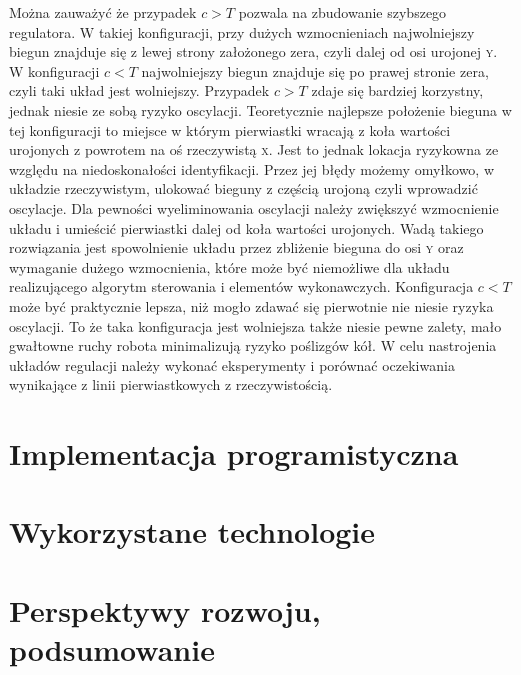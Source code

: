 \documentclass[11pt]{article}
\begin{document}
Można zauważyć że przypadek $ c > T $ pozwala na zbudowanie szybszego regulatora.
W takiej konfiguracji, przy dużych wzmocnieniach najwolniejszy biegun znajduje się z lewej strony założonego zera, czyli dalej od osi urojonej \textsc{y}.
W konfiguracji $ c < T $ najwolniejszy biegun znajduje się po prawej stronie zera, czyli taki układ jest wolniejszy.
Przypadek $ c > T $ zdaje się bardziej korzystny, jednak niesie ze sobą ryzyko oscylacji.
Teoretycznie najlepsze położenie bieguna w tej konfiguracji to miejsce w którym pierwiastki wracają z koła wartości urojonych z powrotem na oś rzeczywistą \textsc{x}.
Jest to jednak lokacja ryzykowna ze względu na niedoskonałości identyfikacji.
Przez jej błędy możemy omyłkowo, w układzie rzeczywistym, ulokować bieguny z częścią urojoną czyli wprowadzić oscylacje.
Dla pewności wyeliminowania oscylacji należy zwiększyć wzmocnienie układu i umieścić pierwiastki dalej od koła wartości urojonych.
Wadą takiego rozwiązania jest spowolnienie układu przez zbliżenie bieguna do osi \textsc{y} oraz wymaganie dużego wzmocnienia, które może być niemożliwe dla układu realizującego algorytm sterowania i elementów wykonawczych.
Konfiguracja $ c < T $ może być praktycznie lepsza, niż mogło zdawać się pierwotnie nie niesie ryzyka oscylacji.
To że taka konfiguracja jest wolniejsza także niesie pewne zalety, mało gwałtowne ruchy robota minimalizują ryzyko poślizgów kół.
W celu nastrojenia układów regulacji należy wykonać eksperymenty i porównać oczekiwania wynikające z linii pierwiastkowych z rzeczywistością.

\section{Implementacja programistyczna}

\section{Wykorzystane technologie}

\section{Perspektywy rozwoju, podsumowanie}
\end{document}
